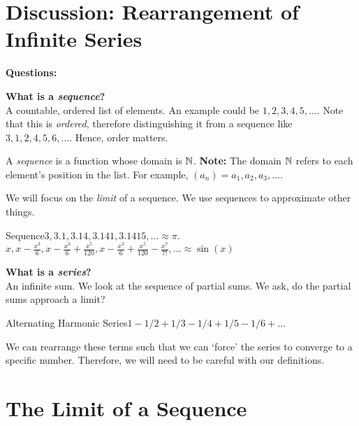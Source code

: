 \section{Discussion: Rearrangement of Infinite Series}

\noindent \textbf{Questions:}

\textbf{What is a \textit{sequence}?} \\

A countable, ordered list of elements. An example could be $1,2,3,4,5,\dots$. Note that this is \textit{ordered}, therefore distinguishing it from a sequence like $3,1,2,4,5,6,\dots$. Hence, order matters.

A \textit{sequence} is a function whose domain is $\mathbb{N}$. \textbf{Note:} The domain $\mathbb{N}$ refers to each element's position in the list. For example, $(a_n) = a_1,a_2,a_3,\dots$.

We will focus on the \textit{limit} of a sequence. We use sequences to approximate other things.

\begin{example}
    {Sequence}$3,3.1,3.14,3.141,3.1415,\dots \approx \pi$. \\
    $x, x - \frac{x^3}{6}, x - \frac{x^3}{6} + \frac{x^5}{120}, x - \frac{x^3}{6} + \frac{x^5}{120} - \frac{x^7}{7!}, \dots \approx \sin(x)$
\end{example}

\noindent\textbf{What is a \textit{series}?} \\

An infinite sum. We look at the sequence of partial sums. We ask, do the partial sums approach a limit?

\begin{example}
    {Alternating Harmonic Series}$1 - 1/2 + 1/3 - 1/4 + 1/5 - 1/6 + \dots$
\end{example}

We can rearrange these terms such that we can `force' the series to converge to a specific number. Therefore, we will need to be careful with our definitions.



\section{The Limit of a Sequence}

